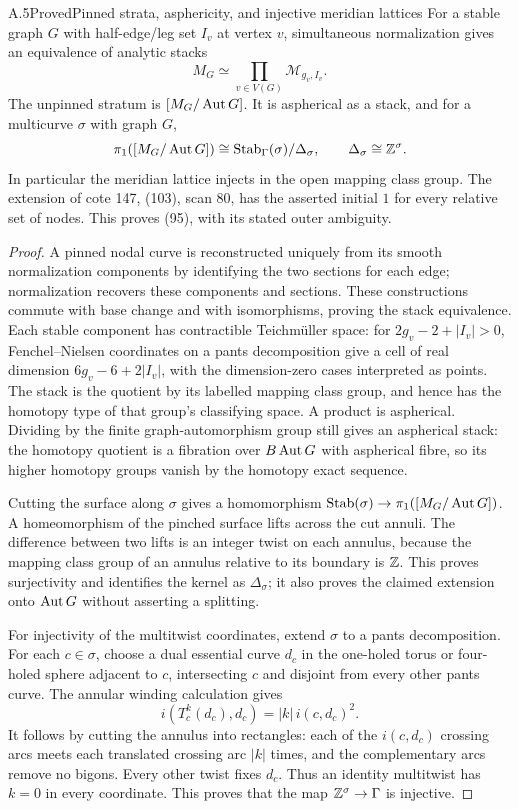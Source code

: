 \begin{result}{A.5}{Proved}{Pinned strata, asphericity, and injective meridian lattices}
For a stable graph $G$ with half-edge/leg set $I_v$ at vertex $v$, simultaneous normalization gives an equivalence of analytic stacks
\[
 M_G\simeq\prod_{v\in V(G)}\mathcal M_{g_v,I_v}.
\]
The unpinned stratum is $[M_G/\operatorname{Aut} G]$. It is aspherical as a stack, and for a multicurve $\sigma$ with graph $G$,
\[
 \pi_1([M_G/\operatorname{Aut} G])\cong\operatorname{Stab}_\Gamma(\sigma)/\Delta_\sigma,
 \qquad \Delta_\sigma\cong\mathbb Z^{\sigma}.
\]
In particular the meridian lattice injects in the open mapping class group. The extension of cote 147, (103), scan 80, has the asserted initial $1$ for every relative set of nodes. This proves (95), with its stated outer ambiguity.
\end{result}
\begin{proof}
A pinned nodal curve is reconstructed uniquely from its smooth normalization components by identifying the two sections for each edge; normalization recovers these components and sections. These constructions commute with base change and with isomorphisms, proving the stack equivalence. Each stable component has contractible Teichm\"uller space: for $2g_v-2+|I_v|>0$, Fenchel--Nielsen coordinates on a pants decomposition give a cell of real dimension $6g_v-6+2|I_v|$, with the dimension-zero cases interpreted as points. The stack is the quotient by its labelled mapping class group, and hence has the homotopy type of that group's classifying space. A product is aspherical. Dividing by the finite graph-automorphism group still gives an aspherical stack: the homotopy quotient is a fibration over $B\operatorname{Aut} G$ with aspherical fibre, so its higher homotopy groups vanish by the homotopy exact sequence.

Cutting the surface along $\sigma$ gives a homomorphism $\operatorname{Stab}(\sigma)\to\pi_1([M_G/\operatorname{Aut} G])$. A homeomorphism of the pinched surface lifts across the cut annuli. The difference between two lifts is an integer twist on each annulus, because the mapping class group of an annulus relative to its boundary is $\mathbb Z$. This proves surjectivity and identifies the kernel as $\Delta_\sigma$; it also proves the claimed extension onto $\operatorname{Aut} G$ without asserting a splitting.

For injectivity of the multitwist coordinates, extend $\sigma$ to a pants decomposition. For each $c\in\sigma$, choose a dual essential curve $d_c$ in the one-holed torus or four-holed sphere adjacent to $c$, intersecting $c$ and disjoint from every other pants curve. The annular winding calculation gives
\[
 i(T_c^k(d_c),d_c)=|k|\,i(c,d_c)^2.
\]
It follows by cutting the annulus into rectangles: each of the $i(c,d_c)$ crossing arcs meets each translated crossing arc $|k|$ times, and the complementary arcs remove no bigons. Every other twist fixes $d_c$. Thus an identity multitwist has $k=0$ in every coordinate. This proves that the map $\mathbb Z^\sigma\to\Gamma$ is injective.


\end{proof}
